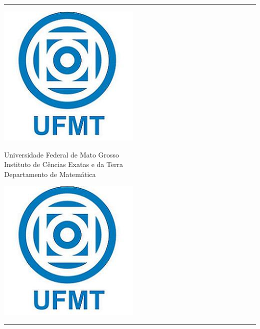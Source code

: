 %
%
\thispagestyle{empty}

\hspace{-1.3cm}\begin{minipage}{16cm}
{\rule[0 ex]{16cm}{0.05cm}}%
\begin{center}
\begin{minipage}[s]{1.8cm}
\includegraphics[scale=0.28]{logo_ufmt.jpg}
\end{minipage}\begin{minipage}[s]{11cm}\noindent
{\begin{center} {\Large Universidade Federal de Mato Grosso}\\
{Instituto de C\^encias Exatas e da Terra}\\
{\sc Departamento de Matem\'atica}
\end{center}}\end{minipage}\begin{minipage}[s]{1.8cm}
\includegraphics[scale=0.28]{logo_ufmt.jpg}
\end{minipage}
\end{center}
{\rule[0 ex]{16cm}{0.05cm}}%
\end{minipage}

